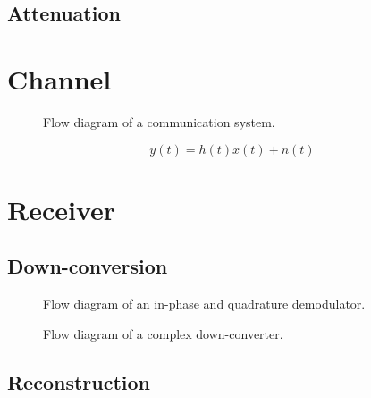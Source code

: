 \subsection{Attenuation}

\section{Channel}


\begin{figure}[htb]
	\centering
	
	\caption{Flow diagram of a communication system.}
\end{figure}
\begin{equation}
	y(t)
	=
	h(t)x(t)
	+
	n(t)
\end{equation}

\section{Receiver}


\subsection{Down-conversion}

\begin{figure}[htb]
	\centering
	
	\caption{Flow diagram of an in-phase and quadrature demodulator.}
\end{figure}
\begin{figure}[htb]
	\centering
	
	\caption{Flow diagram of a complex down-converter.}
\end{figure}

\subsection{Reconstruction}